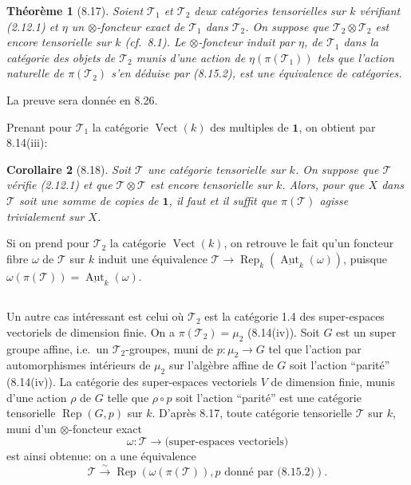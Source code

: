\documentclass[12pt,a4paper]{article}
\theoremstyle{plain}
\newtheorem{theorem}{Théorème}[section]
\newtheorem{corollary}[theorem]{Corollaire}
\theoremstyle{definition}
\DeclareMathOperator{\Aut}{Aut}
\DeclareMathOperator{\Rep}{Rep}
\DeclareMathOperator{\Vect}{Vect}
\begin{document}
\begin{theorem}[8.17]
Soient $\mathcal{T}_1$ et $\mathcal{T}_2$ deux catégories tensorielles sur $k$ vérifiant (2.12.1) et $\eta$ un $\otimes$-foncteur exact de $\mathcal{T}_1$ dans $\mathcal{T}_2$. On suppose que $\mathcal{T}_2 \otimes \mathcal{T}_2$ est encore tensorielle sur $k$ (cf.~8.1). Le $\otimes$-foncteur induit par $\eta$, de $\mathcal{T}_1$ dans la catégorie des objets de $\mathcal{T}_2$ munis d'une action de $\eta(\pi(\mathcal{T}_1))$ tels que l'action naturelle de $\pi(\mathcal{T}_2)$ s'en déduise par (8.15.2), est une équivalence de catégories.
\end{theorem}

La preuve sera donnée en 8.26.

Prenant pour $\mathcal{T}_1$ la catégorie $\Vect(k)$ des multiples de $\mathbf{1}$, on obtient par 8.14(iii):

\begin{corollary}[8.18]
Soit $\mathcal{T}$ une catégorie tensorielle sur $k$. On suppose que $\mathcal{T}$ vérifie (2.12.1) et que $\mathcal{T} \otimes \mathcal{T}$ est encore tensorielle sur $k$. Alors, pour que $X$ dans $\mathcal{T}$ soit une somme de copies de $\mathbf{1}$, il faut et il suffit que $\pi(\mathcal{T})$ agisse trivialement sur $X$.
\end{corollary}

Si on prend pour $\mathcal{T}_2$ la catégorie $\Vect(k)$, on retrouve le fait qu'un foncteur fibre $\omega$ de $\mathcal{T}$ sur $k$ induit une équivalence $\mathcal{T} \to \Rep_k(\underline{\Aut}_k(\omega))$, puisque $\omega(\pi(\mathcal{T})) = \underline{\Aut}_k(\omega)$.

\subsection{}

Un autre cas intéressant est celui où $\mathcal{T}_2$ est la catégorie 1.4 des super-espaces vectoriels de dimension finie. On a $\pi(\mathcal{T}_2) = \mu_2$ (8.14(iv)). Soit $G$ est un super groupe affine, i.e.~un $\mathcal{T}_2$-groupes, muni de $p : \mu_2 \to G$ tel que l'action par automorphismes intérieurs de $\mu_2$ sur l'algèbre affine de $G$ soit l'action ``parité'' (8.14(iv)). La catégorie des super-espaces vectoriels $V$ de dimension finie, munis d'une action $\rho$ de $G$ telle que $\rho \circ p$ soit l'action ``parité'' est une catégorie tensorielle $\Rep(G, p)$ sur $k$. D'après 8.17, toute catégorie tensorielle $\mathcal{T}$ sur $k$, muni d'un $\otimes$-foncteur exact
\[
\omega : \mathcal{T} \to \text{(super-espaces vectoriels)}
\]
est ainsi obtenue: on a une équivalence
\[
\mathcal{T} \xrightarrow{\sim} \Rep(\omega(\pi(\mathcal{T})), p \text{ donné par (8.15.2)}).
\]
\end{document}
